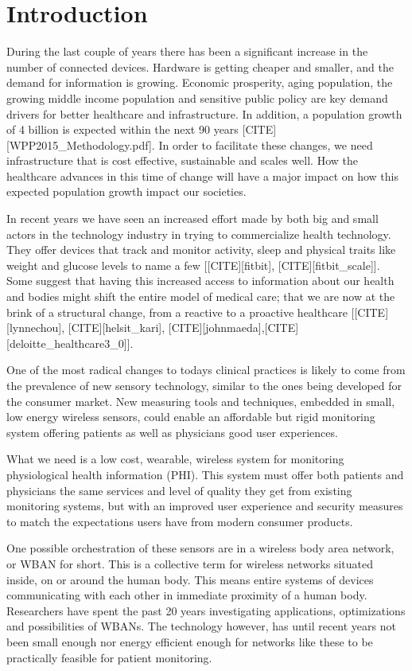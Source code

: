 \section{Introduction} %
\label{sec:introduction}

During the last couple of years there has been a significant increase in the number of connected devices. Hardware is getting cheaper and smaller, and the demand for information is growing. Economic prosperity, aging population, the growing middle income population and sensitive public policy are key demand drivers for better healthcare and infrastructure. In addition, a population growth of 4 billion is expected within the next 90 years [CITE][WPP2015_Methodology.pdf]. In order to facilitate these changes, we need infrastructure that is cost effective, sustainable and scales well. How the healthcare advances in this time of change will have a major impact on how this expected population growth impact our societies. 

In recent years we have seen an increased effort made by both big and small actors in the technology industry in trying to commercialize health technology. They offer devices that track and monitor activity, sleep and physical traits like weight and glucose levels to name a few [[CITE][fitbit], [CITE][fitbit_scale]]. Some suggest that having this increased access to information about our health and bodies might shift the entire model of medical care; that we are now at the brink of a structural change, from a reactive to a proactive healthcare [[CITE][lynnechou], [CITE][helsit_kari], [CITE][johnmaeda],[CITE][deloitte_healthcare3_0]].

One of the most radical changes to todays clinical practices is likely to come from the prevalence of new sensory technology, similar to the ones being developed for the consumer market. New measuring tools and techniques, embedded in small, low energy wireless sensors, could enable an affordable but rigid monitoring system offering patients as well as physicians good user experiences. 

What we need is a low cost, wearable, wireless system for monitoring physiological health information (PHI). This system must offer both patients and physicians the same services and level of quality they get from existing monitoring systems, but with an improved user experience and security measures to match the expectations users have from modern  consumer products. 

One possible orchestration of these sensors are in a wireless body area network, or WBAN for short. This is a collective term for wireless networks situated inside, on or around the human body. This means entire systems of devices communicating with each other in immediate proximity of a human body. Researchers have spent the past 20 years investigating applications, optimizations and possibilities of WBANs. The technology however, has until recent years not been small enough nor energy efficient enough for networks like these to be practically feasible for patient monitoring.

